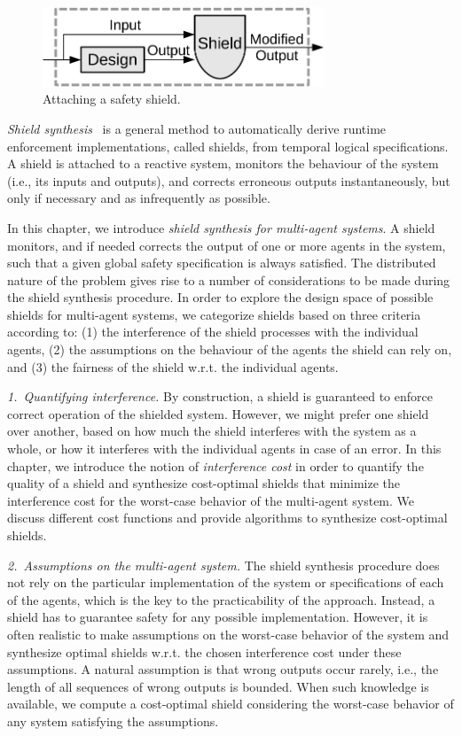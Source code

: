 \begin{figure}
\centering
\includegraphics[width=0.75\textwidth]{MultiShield/figs/attach_shield}
\caption{Attaching a safety shield.}
\label{fig:attach_shield}
\vspace{-.3cm}
\end{figure}
\emph{Shield synthesis}~\cite{KonighoferABHKT17} is a general method to automatically derive runtime enforcement implementations, called shields,
from temporal logical specifications.
A shield is attached to a reactive system, monitors the behaviour of the system (i.e., its inputs and outputs), and corrects
erroneous outputs instantaneously, but only if necessary and as infrequently
as possible.


In this chapter, we introduce \emph{shield synthesis for multi-agent systems}. A shield monitors, and if needed corrects the output of one or more agents in the system, such that a given global safety specification is always satisfied. The distributed nature of the problem gives rise to a number of considerations to be made during the shield synthesis procedure. In order to explore the design space of possible shields for multi-agent systems, we categorize shields based on three criteria according to:
(1) the interference of the shield processes with the individual agents,
(2) the assumptions on the behaviour of the agents the shield can rely on, and
(3) the fairness of the shield w.r.t. the individual agents.


\emph{1.\ Quantifying interference.}
By construction, a shield is guaranteed to enforce correct operation of the shielded system. However, we might prefer one shield over another, based on how much the shield interferes with the system as a whole, or how it interferes with the individual agents in case of an error. In this chapter, we introduce the notion of  \emph{interference cost}
in order to quantify the quality of a shield
and synthesize cost-optimal shields that minimize the interference cost for the worst-case behavior of the multi-agent system.
We discuss different cost functions and provide algorithms to synthesize cost-optimal shields.

\emph{2.\ Assumptions on the multi-agent system.}
The shield synthesis procedure does not rely on the particular implementation of the system or specifications of each of the  agents, which is the key to the practicability of the approach. Instead, a shield has to guarantee safety for any possible implementation.
However, it is often realistic to make assumptions on the worst-case behavior of the system and  synthesize optimal shields w.r.t. the chosen interference cost under these assumptions. A natural assumption is that wrong outputs occur rarely, i.e., the length of all sequences of wrong outputs is bounded.
When such knowledge is available, we compute a cost-optimal shield considering the worst-case behavior of any system satisfying the assumptions.

